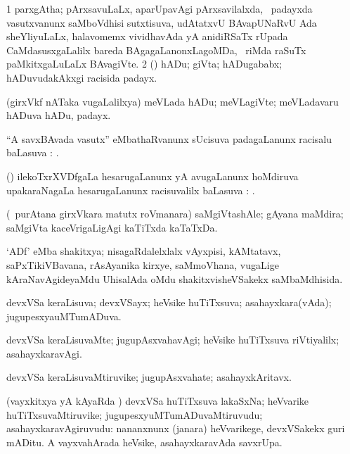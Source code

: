 \bentry
{}
\gl{\nA}
\bmng
\bnum
\num{1} parxgAtha; pArxsavuLaLx, aparUpavAgi pArxsavilalxda, \sA\ padayxda vasutxvanunx saMboVdhisi sutxtisuva, udAtatxvU BAvapUNaRvU Ada sheYliyuLaLx, halavomemx vividhavAda yA anidiRSaTx rUpada CaMdasusxgaLalilx bareda BAgagaLanonxLagoMDa, \sA\ riMda raSuTx paMkitxgaLuLaLx BAvagiVte. 
\num{2} (\ca) hADu; giVta; hADugababx; hADuvudakAkxgi racisida padayx. 
\enum
\emng

\noindent
\gl{\pagu}
\bmng
{} (girxVkf nATaka \mo vugaLalilxya) meVLada hADu; meVLagiVte; meVLadavaru hADuva hADu, padayx. 
\emng
\eentry

\bentry
{}
\gl{\uparx}
\bmng
``A savxBAvada vasutx'' eMbathaRvanunx sUcisuva padagaLanunx racisalu baLasuva \uparx: . 
\emng
\eentry

\bentry
{}
\gl{\saupa}
\bmng
(\viduyx) ilekoTxrXVDfgaLa hesarugaLanunx yA avugaLanunx hoMdiruva upakaraNagaLa hesarugaLanunx racisuvalilx baLasuva \saupa: . 
\emng
\eentry

\bentry
{}
\gl{\nA}
\bmng
(\kanmu\ purAtana girxVkara matutx roVmanara) saMgiVtashAle; gAyana maMdira; saMgiVta kaceVrigaLigAgi kaTiTxda kaTaTxDa. 
\emng
\eentry

\bentry
{}
\gl{\gu}
\bmng
`ADf' eMba shakitxya; nisagaRdalelxlalx vAyxpisi, kAMtatavx, saPxTikiVBavana, rAsAyanika kirxye, saMmoVhana, \mo vugaLige kAraNavAgideyaMdu UhisalAda oMdu shakitxvisheVSakekx saMbaMdhisida. 
\emng
\eentry

\bentry
{}
\gl{\gu}
\bmng
devxVSa keraLisuva; devxVSayx; heVsike huTiTxsuva; asahayxkara(vAda); jugupesxyauMTumADuva. 
\emng
\eentry

\bentry
{}
\gl{\kirxvi}
\bmng
devxVSa keraLisuvaMte; jugupAsxvahavAgi; heVsike huTiTxsuva riVtiyalilx; asahayxkaravAgi. 
\emng
\eentry

\bentry
{}
\gl{\nA}
\bmng
devxVSa keraLisuvaMtiruvike; jugupAsxvahate; asahayxkAritavx. 
\emng
\eentry

\bentry
{}
\gl{\nA}
\bmng
(vayxkitxya yA kAyaRda \vi) devxVSa huTiTxsuva lakaSxNa; heVvarike huTiTxsuvaMtiruvike; jugupesxyuMTumADuvaMtiruvudu; asahayxkaravAgiruvudu:  nananxnunx (janara) heVvarikege, devxVSakekx guri mADitu.  A vayxvahArada heVsike, asahayxkaravAda savxrUpa. 
\emng
\eentry

